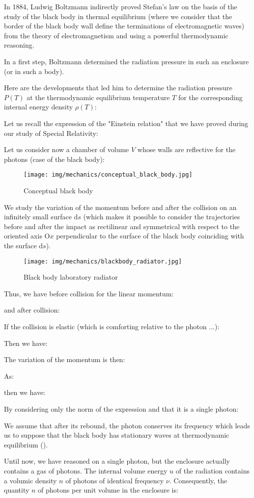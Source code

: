 	In 1884,  Ludwig Boltzmann indirectly proved Stefan's law on the basis of the study of the black body in thermal equilibrium (where we consider that the border of the black body wall define the terminations of electromagnetic waves) from the theory of electromagnetism and using a powerful thermodynamic reasoning.
	\begin{dem}
	In a first step, Boltzmann determined the radiation pressure in such an enclosure (or in such a body).

	Here are the developments that led him to determine the radiation pressure $P (T)$ at the thermodynamic equilibrium temperature $T$ for the corresponding internal energy density $\rho(T)$:

	Let us recall the expression of the "Einstein relation" that we have proved during our study of Special Relativity:
	
	Let us consider now a chamber of volume $V$ whose walls are reflective for the photons (case of the black body):
	\begin{figure}[H]
		\centering
		\texttt{[image: img/mechanics/conceptual\_black\_body.jpg]}
		\caption{Conceptual black body}
	\end{figure}	
	We study the variation of the momentum before and after the collision on an infinitely small surface $\mathrm{d}s$ (which makes it possible to consider the trajectories before and after the impact as rectilinear and symmetrical with respect to the oriented axis O$x$ perpendicular to the surface of the black body coinciding with the surface $\mathrm{d}s$).
	\begin{figure}[H]
		\centering
		\texttt{[image: img/mechanics/blackbody\_radiator.jpg]}
		\caption{Black body laboratory radiator}
	\end{figure}
	Thus, we have before collision for the linear momentum:
	
	and after collision:
	
	If the collision is elastic (which is comforting relative to the photon ...):
	
	Then we have:
	
	The variation of the momentum is then:
	
	As:
	
	then we have:
	
	By considering only the norm of the expression and that it is a single photon:
	
	\begin{tcolorbox}[title=Remark,colframe=black,arc=10pt]
	We assume that after its rebound, the photon conserves its frequency which leads us to suppose that the black body has stationary waves at thermodynamic equilibrium ().
	\end{tcolorbox}
	Until now, we have reasoned on a single photon, but the enclosure actually contains a gas of photons. The internal volume energy $u$ of the radiation contains a volumic density $n$ of photons of identical frequency $\nu$. Consequently, the quantity $n$ of photons per unit volume in the enclosure is:
	

\end{dem}
